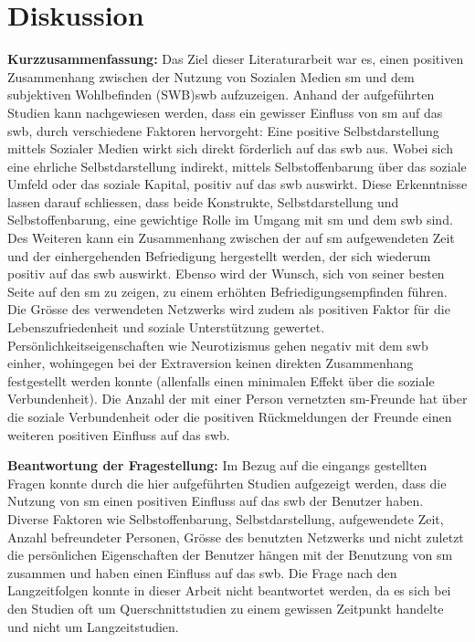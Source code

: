 \chapter{Diskussion}\label{chap.diskussion} 
\glsresetall
\textbf{Kurzzusammenfassung:}\newline
Das Ziel dieser Literaturarbeit war es, einen positiven Zusammenhang zwischen der Nutzung von Sozialen Medien \gls{sm} und dem subjektiven Wohlbefinden (SWB)\gls{swb} aufzuzeigen. Anhand der aufgeführten Studien kann nachgewiesen werden, dass ein gewisser Einfluss von \gls{sm} auf das \gls{swb}, durch verschiedene Faktoren hervorgeht: Eine positive Selbstdarstellung mittels Sozialer Medien wirkt sich direkt förderlich auf das \gls{swb} aus. Wobei sich eine ehrliche Selbstdarstellung indirekt, mittels Selbstoffenbarung über das soziale Umfeld oder das soziale Kapital, positiv auf das \gls{swb} auswirkt. Diese Erkenntnisse lassen darauf schliessen, dass beide Konstrukte, Selbstdarstellung und Selbstoffenbarung, eine gewichtige Rolle im Umgang mit \gls{sm} und dem \gls{swb} sind. Des Weiteren kann ein Zusammenhang zwischen der auf \gls{sm} aufgewendeten Zeit und der einhergehenden Befriedigung hergestellt werden, der sich wiederum positiv auf das \gls{swb} auswirkt. Ebenso wird der Wunsch, sich von seiner besten Seite auf den \gls{sm} zu zeigen, zu einem erhöhten Befriedigungsempfinden führen. Die Grösse des verwendeten Netzwerks wird zudem als positiven Faktor für die Lebenszufriedenheit und soziale Unterstützung gewertet. Persönlichkeitseigenschaften wie Neurotizismus gehen negativ mit dem \gls{swb} einher, wohingegen bei der Extraversion keinen direkten Zusammenhang festgestellt werden konnte (allenfalls einen minimalen Effekt über die soziale Verbundenheit). Die Anzahl der mit einer Person vernetzten \gls{sm}-Freunde hat über die soziale Verbundenheit oder die positiven Rückmeldungen der Freunde einen weiteren positiven Einfluss auf das \gls{swb}.\par 
\textbf{Beantwortung der Fragestellung:}\newline
Im Bezug auf die eingangs gestellten Fragen konnte durch die hier aufgeführten Studien aufgezeigt werden, dass die Nutzung von \gls{sm} einen positiven Einfluss auf das \gls{swb} der Benutzer haben. Diverse Faktoren wie Selbstoffenbarung, Selbstdarstellung, aufgewendete Zeit, Anzahl befreundeter Personen, Grösse des benutzten Netzwerks und nicht zuletzt die persönlichen Eigenschaften der Benutzer hängen mit der Benutzung von \gls{sm} zusammen und haben einen Einfluss auf das \gls{swb}. Die Frage nach den Langzeitfolgen konnte in dieser Arbeit nicht beantwortet werden, da es sich bei den Studien oft um Querschnittstudien zu einem gewissen Zeitpunkt handelte und nicht um Langzeitstudien. \par 
